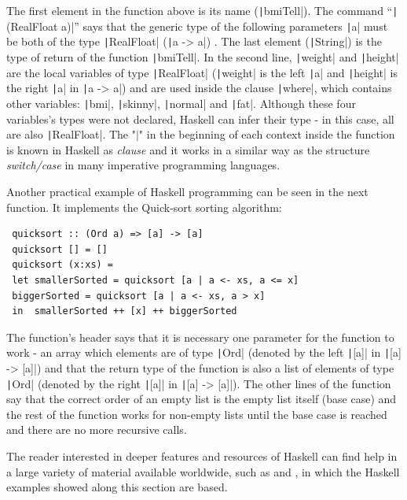\documentclass[oneside,12pt]{scrbook}
\newcommand{\haskell}[1]{\texttt|#1|}
\theoremstyle{definition}
\theoremstyle{plain}
\theoremstyle{definition}
\begin{document}
The first element in the function above is its name (\haskell{bmiTell}). The command \linebreak ``\haskell{(RealFloat a)}'' says that the generic type of the following parameters \haskell{a} must be both of the type \haskell{RealFloat} (\haskell{a -> a}) . The last element (\haskell{String}) is the type of return of the function \haskell{bmiTell}. In the second line, \haskell{weight} and \haskell{height} are the local variables of type \haskell{RealFloat} (\haskell{weight} is the left \haskell{a} and \haskell{height} is the right \haskell{a} in \haskell{a -> a})
 and are used inside the clause \haskell{where}, which contains other variables: \haskell{bmi}, \haskell{skinny}, \haskell{normal} and \haskell{fat}. Although these four variables's types were not declared, Haskell can infer their type - in this case, all are also \haskell{RealFloat}. The "$\mid$" in the beginning of each context inside the function is known in Haskell as \textit{clause} and it works in a similar way as the structure \textit{switch/case} in many imperative programming languages.
 
 Another practical example of Haskell programming can be seen in the next function. It implements the Quick-sort sorting algorithm:
 
 \begin{verbatim}
 quicksort :: (Ord a) => [a] -> [a]  
 quicksort [] = []  
 quicksort (x:xs) =   
 let smallerSorted = quicksort [a | a <- xs, a <= x]  
 biggerSorted = quicksort [a | a <- xs, a > x]  
 in  smallerSorted ++ [x] ++ biggerSorted
 \end{verbatim}
 
 The function's header says that it is necessary one parameter for the function to work - an array which elements are of type \haskell{Ord} (denoted by the left \haskell{[a]} in \haskell{[a] -> [a]}) and that the return type of the function is also a list of elements of type \haskell{Ord} (denoted by the right \haskell{[a]} in \haskell{[a] -> [a]}). The other lines of the function say that the correct order of an empty list is the empty list itself (base case) and the rest of the function works for non-empty lists until the base case is reached and there are no more recursive calls.
 
The reader interested in deeper features and resources of Haskell can find help in a large variety of material available worldwide, such as \cite{Haskell98} and \cite{Lipovaca2011}, in which the Haskell examples showed along this section are based.
\end{document}
